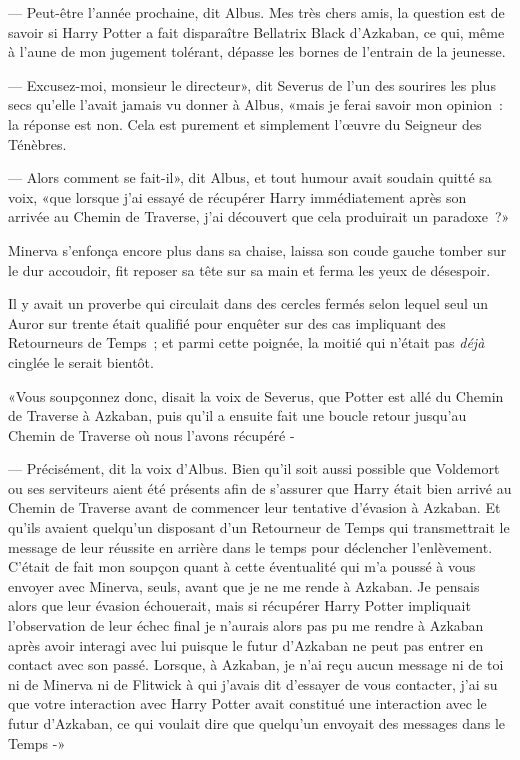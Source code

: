 --- Peut-être l'année prochaine, dit Albus. Mes très chers amis, la question est de savoir si Harry Potter a fait disparaître Bellatrix Black d'Azkaban, ce qui, même à l'aune de mon jugement tolérant, dépasse les bornes de l'entrain de la jeunesse.

--- Excusez-moi, monsieur le directeur», dit Severus de l'un des sourires les plus secs qu'elle l'avait jamais vu donner à Albus, «mais je ferai savoir mon opinion~: la réponse est non. Cela est purement et simplement l'œuvre du Seigneur des Ténèbres.

--- Alors comment se fait-il», dit Albus, et tout humour avait soudain quitté sa voix, «que lorsque j'ai essayé de récupérer Harry immédiatement après son arrivée au Chemin de Traverse, j'ai découvert que cela produirait un paradoxe~?»

Minerva s'enfonça encore plus dans sa chaise, laissa son coude gauche tomber sur le dur accoudoir, fit reposer sa tête sur sa main et ferma les yeux de désespoir.

Il y avait un proverbe qui circulait dans des cercles fermés selon lequel seul un Auror sur trente était qualifié pour enquêter sur des cas impliquant des Retourneurs de Temps~; et parmi cette poignée, la moitié qui n'était pas \emph{déjà} cinglée le serait bientôt.

«Vous soupçonnez donc, disait la voix de Severus, que Potter est allé du Chemin de Traverse à Azkaban, puis qu'il a ensuite fait une boucle retour jusqu'au Chemin de Traverse où nous l'avons récupéré -

--- Précisément, dit la voix d'Albus. Bien qu'il soit aussi possible que Voldemort ou ses serviteurs aient été présents afin de s'assurer que Harry était bien arrivé au Chemin de Traverse avant de commencer leur tentative d'évasion à Azkaban. Et qu'ils avaient quelqu'un disposant d'un Retourneur de Temps qui transmettrait le message de leur réussite en arrière dans le temps pour déclencher l'enlèvement. C'était de fait mon soupçon quant à cette éventualité qui m'a poussé à vous envoyer avec Minerva, seuls, avant que je ne me rende à Azkaban. Je pensais alors que leur évasion échouerait, mais si récupérer Harry Potter impliquait l'observation de leur échec final je n'aurais alors pas pu me rendre à Azkaban après avoir interagi avec lui puisque le futur d'Azkaban ne peut pas entrer en contact avec son passé. Lorsque, à Azkaban, je n'ai reçu aucun message ni de toi ni de Minerva ni de Flitwick à qui j'avais dit d'essayer de vous contacter, j'ai su que votre interaction avec Harry Potter avait constitué une interaction avec le futur d'Azkaban, ce qui voulait dire que quelqu'un envoyait des messages dans le Temps -»

